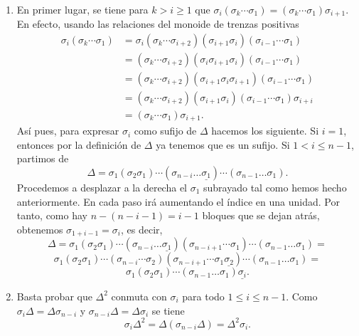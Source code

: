 \documentclass[TFG.tex]{subfiles}
\begin{document}
\begin{dem}\
\begin{enumerate}
\item En primer lugar, se tiene para $k>i\geq 1$ que $\sigma_i(\sigma_k\cdots\sigma_1)=(\sigma_k\cdots\sigma_1)\sigma_{i+1}$. En efecto, usando las relaciones del monoide de trenzas positivas
\begin{align*}
\sigma_i(\sigma_k\cdots\sigma_1)&=\sigma_i(\sigma_k\cdots\sigma_{i+2})(\sigma_{i+1}\sigma_i)(\sigma_{i-1}\cdots\sigma_1)\\
&=(\sigma_k\cdots\sigma_{i+2})(\sigma_i\sigma_{i+1}\sigma_i)(\sigma_{i-1}\cdots\sigma_1)\\
&=(\sigma_k\cdots\sigma_{i+2})(\sigma_{i+1}\sigma_i\sigma_{i+1})(\sigma_{i-1}\cdots\sigma_1)\\
&=(\sigma_k\cdots\sigma_{i+2})(\sigma_{i+1}\sigma_i)(\sigma_{i-1}\cdots\sigma_1)\sigma_{i+i}\\
&=(\sigma_k\cdots\sigma_1)\sigma_{i+1}.
\end{align*}
Así pues, para expresar $\sigma_i$ como sufijo de $\Delta$ hacemos los siguiente. Si $i=1$, entonces por la definición de $\Delta$ ya tenemos que es un sufijo. Si $1<i\leq n-1$, partimos de
\[
\Delta=\sigma_1(\sigma_2\sigma_1)\cdots(\sigma_{n-i}\dots\underline{\sigma_1})\cdots(\sigma_{n-1}\dots\sigma_1).
\]
Procedemos a desplazar a la derecha el $\sigma_1$ subrayado tal como hemos hecho anteriormente. En cada paso irá aumentando el índice en una unidad. Por tanto, como hay $n-(n-i-1)=i-1$ bloques que se dejan atrás, obtenemos $\sigma_{1+i-1}=\sigma_i$, es decir,
\[
\Delta=\sigma_1(\sigma_2\sigma_1)\cdots(\sigma_{n-i}\dots\underline{\sigma_1})(\sigma_{n-i+1}\cdots\sigma_1)\cdots(\sigma_{n-1}\dots\sigma_1)=
\]
\[
\sigma_1(\sigma_2\sigma_1)\cdots(\sigma_{n-i}\cdots\sigma_2)(\sigma_{n-i+1}\cdots\sigma_1\underline{\sigma_2})\cdots(\sigma_{n-1}\dots\sigma_1)=
\]
\[
\sigma_1(\sigma_2\sigma_1)\cdots(\sigma_{n-1}\dots\sigma_1)\underline{\sigma_i}.
\]

\item Basta probar que $\Delta^2$ conmuta con $\sigma_i$ para todo $1\leq i\leq n-1$. Como $\sigma_i\Delta=\Delta\sigma_{n-i}$ y $\sigma_{n-i}\Delta=\Delta\sigma_i$ se tiene
\[
\sigma_i\Delta^2=\Delta(\sigma_{n-i}\Delta)=\Delta^2\sigma_i.
\]


\end{enumerate}
\end{dem}
\end{document}
